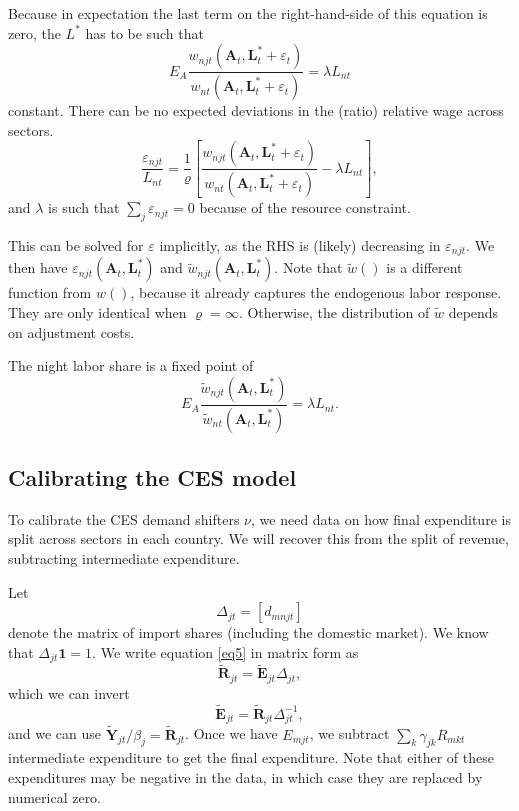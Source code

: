 \documentclass[12pt]{article}
\begin{document}
Because in expectation the last term on the right-hand-side of this equation is zero, the $L^*$ has to be such that
\[
E_{A}\frac 
	{w_{njt}(\mathbf A_{t}, \mathbf L_{t}^*+\varepsilon_t)}
	{w_{nt}(\mathbf A_{t}, \mathbf L_{t}^*+\varepsilon_t)}
= \lambda L_{nt}
\]
constant. There can be no expected deviations in the (ratio) relative wage across sectors. 
\begin{equation}\label{eq:varepsilon}
\frac {\varepsilon_{njt}} {L_{nt}}
=
\frac 1\varrho
\left[
\frac 
	{w_{njt}(\mathbf A_{t}, \mathbf L_{t}^*+\varepsilon_t)}
	{w_{nt}(\mathbf A_{t}, \mathbf L_{t}^*+\varepsilon_t)}
	-\lambda L_{nt}
\right],
\end{equation}
and $\lambda$ is such that $\sum_j\varepsilon_{njt}=0$ because of the resource constraint.

This can be solved for $\varepsilon$ implicitly, as the RHS is (likely) decreasing in $\varepsilon_{njt}$. We then have $\varepsilon_{njt}(\mathbf A_t, \mathbf L_t^*)$ and $\tilde w_{njt}(\mathbf A_t, \mathbf L_t^*)$. Note that $\tilde w()$ is a different function from $w()$, because it already captures the endogenous labor response. They are only identical when $\varrho=\infty$. Otherwise, the distribution of $\tilde w$ depends on adjustment costs. 

The night labor share is a fixed point of
\[
E_{A}\frac 
	{\tilde w_{njt}(\mathbf A_{t}, \mathbf L_{t}^*)}
	{\tilde w_{nt}(\mathbf A_{t}, \mathbf L_{t}^*)}
= \lambda L_{nt}.
\]
\subsection{Calibrating the CES model}
To calibrate the CES demand shifters $\nu$, we need data on how final expenditure is split across sectors in each country. We will recover this from the split of revenue, subtracting intermediate expenditure.

Let
\[
\Delta_{jt} = [d_{mnjt}] 
\]
denote the matrix of import shares (including the domestic market). We know that $\Delta_{jt}\mathbf 1=1$. We write equation \eqref{eq5} in matrix form as
\begin{equation}
	\tilde {\mathbf R}_{jt} = \tilde {\mathbf E}_{jt}\Delta_{jt},
\end{equation}
which we can invert
\begin{equation}
	\tilde {\mathbf E}_{jt} = \tilde {\mathbf R}_{jt}\Delta_{jt}^{-1},
	\end{equation}
and we can use $\tilde {\mathbf Y}_{jt}/\beta_j = \tilde{\mathbf R}_{jt}$. Once we have $E_{mjt}$, we subtract $\sum_k\gamma_{jk}R_{mkt}$ intermediate expenditure to get the final expenditure. Note that either of these expenditures may be negative in the data, in which case they are replaced by numerical zero.
\end{document}
